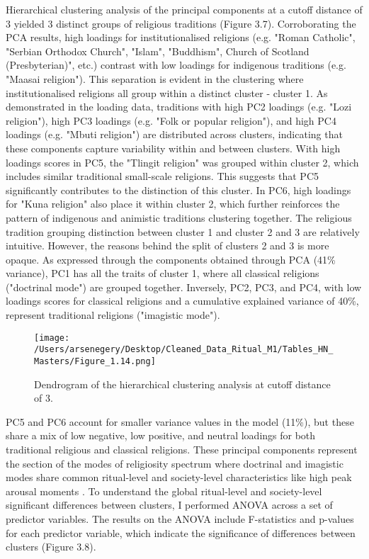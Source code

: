 \documentclass[12pt]{report}
\begin{document}
	\noindent Hierarchical clustering analysis of the principal components at a cutoff distance of 3 yielded 3 distinct groups of religious traditions (Figure 3.7). Corroborating the PCA results, high loadings for institutionalised religions (e.g. "Roman Catholic", "Serbian Orthodox Church", "Islam", "Buddhism", Church of Scotland (Presbyterian)", etc.) contrast with low loadings for indigenous traditions (e.g. "Maasai religion"). This separation is evident in the clustering where institutionalised religions all group within a distinct cluster - cluster 1. As demonstrated in the loading data, traditions with high PC2 loadings (e.g. "Lozi religion"), high PC3 loadings (e.g. "Folk or popular religion"), and high PC4 loadings (e.g. "Mbuti religion") are distributed across clusters, indicating that these components capture variability within and between clusters. With high loadings scores in PC5, the "Tlingit religion" was grouped within cluster 2, which includes similar traditional small-scale religions. This suggests that PC5 significantly contributes to the distinction of this cluster. In PC6, high loadings for "Kuna religion" also place it within cluster 2, which further reinforces the pattern of indigenous and animistic traditions clustering together. The religious tradition grouping distinction between cluster 1 and cluster 2 and 3 are relatively intuitive. However, the reasons behind the split of clusters 2 and 3 is more opaque. As expressed through the components obtained through PCA (41\% variance), PC1 has all the traits of cluster 1, where all classical religions ("doctrinal mode") are grouped together. Inversely, PC2, PC3, and PC4, with low loadings scores for classical religions and a cumulative explained variance of 40\%, represent traditional religions ("imagistic mode").\\
	
	\begin{figure}[htbp]
		\centering
		\texttt{[image: /Users/arsenegery/Desktop/Cleaned\_Data\_Ritual\_M1/Tables\_HN\_Masters/Figure\_1.14.png]} %
		\caption{Dendrogram of the hierarchical clustering analysis at cutoff distance of 3.} 
		\label{fig:table14}
	\end{figure}
	
\noindent PC5 and PC6 account for smaller variance values in the model (11\%), but these share a mix of low negative, low positive,  and neutral loadings for both traditional religious and classical religions. These principal components represent the section of the modes of religiosity spectrum where doctrinal and imagistic modes share common ritual-level and society-level characteristics like high peak arousal moments \cite{richman2018}. To understand the global ritual-level and society-level significant differences between clusters, I performed ANOVA across a set of predictor variables. The results on the ANOVA include F-statistics and p-values for each predictor variable, which indicate the significance of differences between clusters (Figure 3.8).\\
\end{document}

